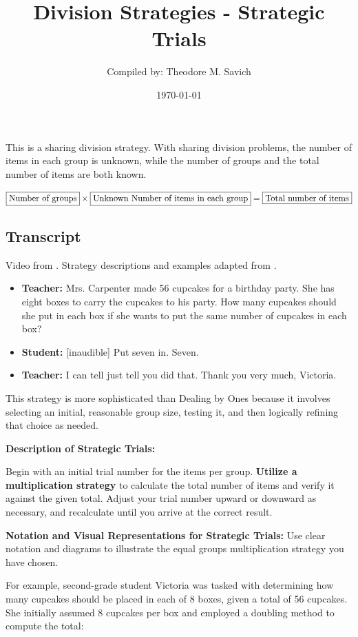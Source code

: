 \documentclass[11pt]{article}
\title{Division Strategies - Strategic Trials}
\author{Compiled by: Theodore M. Savich}
\date{\today}
\begin{document}
\maketitle


This is a sharing division strategy. With sharing division problems, the number of items in each group is unknown, while the number of groups and the total number of items are both known. 

$\fbox{Number of groups} \times \fbox{Unknown Number of items in each group}  = \fbox{Total number of items}$

\subsection*{Transcript}
Video from \textcite{Carpenter1999}. Strategy descriptions and examples adapted from \textcite{HackenbergCourseNotes}. 

\begin{itemize}
    \item \textbf{Teacher:} Mrs. Carpenter made 56 cupcakes for a birthday party. She has eight boxes to carry the cupcakes to his party. How many cupcakes should she put in each box if she wants to put the same number of cupcakes in each box? 
    \item \textbf{Student:} [inaudible] Put seven in. Seven. 
    \item \textbf{Teacher:} I can tell just tell you did that. Thank you very much, Victoria.
\end{itemize}





\noindent This strategy is more sophisticated than Dealing by Ones because it involves selecting an initial, reasonable group size, testing it, and then logically refining that choice as needed.

\noindent \textbf{Description of Strategic Trials:}

\noindent Begin with an initial trial number for the items per group. \textbf{Utilize a multiplication strategy} to calculate the total number of items and verify it against the given total. Adjust your trial number upward or downward as necessary, and recalculate until you arrive at the correct result.


\noindent \textbf{Notation and Visual Representations for Strategic Trials:}
Use clear notation and diagrams to illustrate the equal groups multiplication strategy you have chosen.

For example, second-grade student Victoria was tasked with determining how many cupcakes should be placed in each of 8 boxes, given a total of 56 cupcakes. She initially assumed 8 cupcakes per box and employed a doubling method to compute the total:
\end{document}
